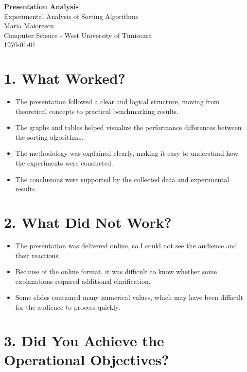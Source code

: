 \documentclass[12pt]{article}
\begin{document}
\begin{center}
    \textbf{\Large Presentation Analysis}\\[0.5cm]
    \large Experimental Analysis of Sorting Algorithms\\[0.5cm]
    
    Maria Maiorescu\\
    Computer Science - West University of Timisoara\\
    \today
\end{center}

\vspace{0.5cm}

\section*{1. What Worked?}

\begin{itemize}
    \item The presentation followed a clear and logical structure, moving from theoretical concepts to practical benchmarking results.
    \item The graphs and tables helped visualize the performance differences between the sorting algorithms.
    \item The methodology was explained clearly, making it easy to understand how the experiments were conducted.
    \item The conclusions were supported by the collected data and experimental results.
\end{itemize}

\section*{2. What Did Not Work?}

\begin{itemize}
    \item The presentation was delivered online, so I could not see the audience and their reactions.
    \item Because of the online format, it was difficult to know whether some explanations required additional clarification.
    \item Some slides contained many numerical values, which may have been difficult for the audience to process quickly.
\end{itemize}

\section*{3. Did You Achieve the Operational Objectives?}
\end{document}
